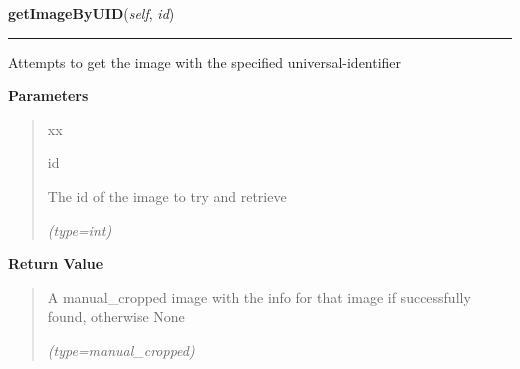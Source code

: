 \hspace{.8\funcindent}\begin{boxedminipage}{\funcwidth}

    \raggedright \textbf{getImageByUID}(\textit{self}, \textit{id})

    \vspace{-1.5ex}

    \rule{\textwidth}{0.5\fboxrule}
\setlength{\parskip}{2ex}
    Attempts to get the image with the specified universal-identifier

\setlength{\parskip}{1ex}
      \textbf{Parameters}
      \vspace{-1ex}

      \begin{quote}
        \begin{Ventry}{xx}

          \item[id]

          The id of the image to try and retrieve

            {\it (type=int)}

        \end{Ventry}

      \end{quote}

      \textbf{Return Value}
    \vspace{-1ex}

      \begin{quote}
      A manual\_cropped image with the info for that image if successfully 
      found, otherwise None

      {\it (type=manual\_cropped)}

      \end{quote}

    \end{boxedminipage}

    \label{src:dao:manual_cropped_dao:ManualCroppedDAO:getImage}

    \vspace{0.5ex}

